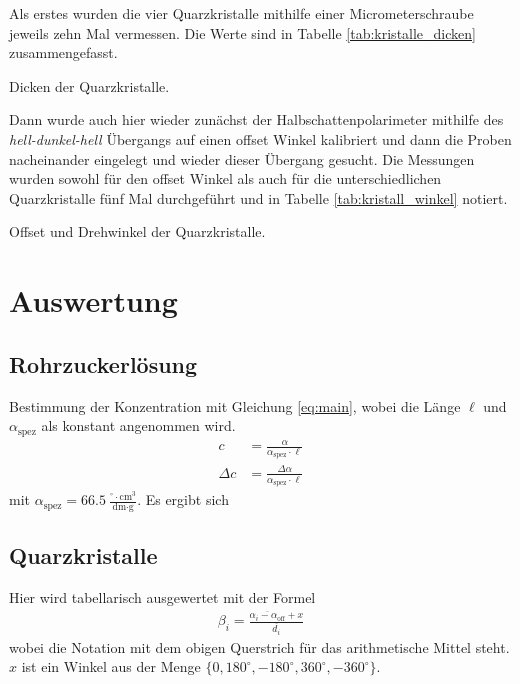 \documentclass{article}
\newcommand{\as}{\alpha_\text{spez}}
\begin{document}
Als erstes wurden die vier Quarzkristalle mithilfe einer Micrometerschraube jeweils zehn Mal vermessen. Die Werte sind in Tabelle \ref{tab:kristalle_dicken} zusammengefasst.

\begin{table}[H]
\caption{Dicken der Quarzkristalle.}
\label{tab:kristalle_dicken}
\centering

\end{table}


Dann wurde auch hier wieder zunächst der Halbschattenpolarimeter mithilfe des \textit{hell-dunkel-hell} Übergangs auf einen offset Winkel kalibriert und dann die Proben nacheinander eingelegt und wieder dieser Übergang gesucht. Die Messungen wurden sowohl für den offset Winkel als auch für die unterschiedlichen Quarzkristalle fünf Mal durchgeführt und in Tabelle \ref{tab:kristall_winkel} notiert.



\begin{table}[H]
\caption{Offset und Drehwinkel der Quarzkristalle.}
\label{tab:kristall_winkel}
\centering

\end{table}


\section{Auswertung}


\subsection{Rohrzuckerlösung}


Bestimmung der Konzentration mit Gleichung \eqref{eq:main}, wobei die Länge $\ell$ und $\as$ als konstant angenommen wird.
\begin{align*}
c &= \frac{\alpha}{\as\cdot \ell} \\
\Delta c &= \frac{\Delta \alpha}{\as\cdot \ell}
\end{align*}
mit $\as = 66.5~\frac{{}^\circ\cdot \text{cm}^3}{\text{dm}\cdot \text{g}}$. Es ergibt sich



\subsection{Quarzkristalle}

Hier wird tabellarisch ausgewertet mit der Formel
\begin{align*}
\beta_i = \frac{\overline{\alpha_i-\alpha_{\text{off}}} + x}{\overline{d_i}}
\end{align*}
wobei die Notation mit dem obigen Querstrich für das arithmetische Mittel steht. $x$ ist ein Winkel aus der Menge $\{0, 180^\circ, -180^\circ, 360^\circ, -360^\circ\}$.
\end{document}
